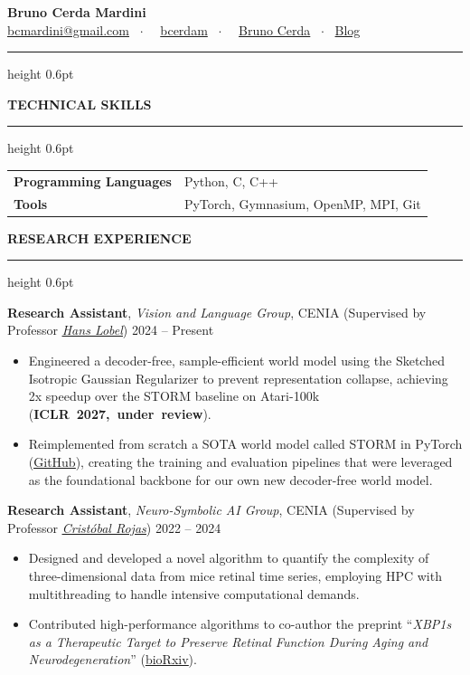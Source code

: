 \documentclass[10pt,a4paper]{article}
\newcommand{\cvsection}[1]{%
    \vspace{10pt}%
    {\large\textbf{\MakeUppercase{#1}}}%
    \vspace{3pt}%
    \hrule height 0.6pt%
    \vspace{6pt}%
}
\begin{document}
{\LARGE\textbf{Bruno Cerda Mardini}}\\[4pt]
\href{mailto:bcmardini@gmail.com}{bcmardini@gmail.com} \ $\cdot$ \ \faGithub\ \href{https://github.com/bcerdam}{bcerdam} \ $\cdot$ \ \faLinkedin\ \href{https://www.linkedin.com/in/bruno-cerda-mardini-04658520b/}{Bruno Cerda} \ $\cdot$ \ \href{https://bcerdam.github.io/website/}{Blog}

\vspace{6pt}
\hrule height 0.6pt
\vspace{2pt}

\cvsection{Technical Skills}
\begin{tabular}{@{}p{5.2cm}l@{}}
\textbf{Programming Languages} & Python, C, C++ \\
\textbf{Tools} & PyTorch, Gymnasium, OpenMP, MPI, Git \\
\end{tabular}

\cvsection{Research Experience}

\textbf{Research Assistant}, \textit{Vision and Language Group}, CENIA (Supervised by Professor \href{https://scholar.google.com/citations?user=oKYALakAAAAJ&hl=en}{\textit{\underline{Hans Lobel}}}) \hfill 2024 -- Present
\begin{itemize}
    \item Engineered a decoder-free, sample-efficient world model using the Sketched Isotropic Gaussian Regularizer to prevent representation collapse, achieving 2x speedup over the STORM baseline on Atari-100k \mbox{(\textbf{ICLR 2027, under review})}.
    \item Reimplemented from scratch a SOTA world model called STORM in PyTorch (\href{https://github.com/bcerdam/STORM-Replication}{\underline{GitHub}}), creating the training and evaluation pipelines that were leveraged as the foundational backbone for our own new decoder-free world model.
\end{itemize}

\vspace{6pt}
\textbf{Research Assistant}, \textit{Neuro-Symbolic AI Group}, CENIA (Supervised by Professor \href{https://scholar.google.com/citations?user=Z1aTUGsAAAAJ&hl=es}{\textit{\underline{Cristóbal Rojas}}}) \hfill 2022 -- 2024
\begin{itemize}
    \item Designed and developed a novel algorithm to quantify the complexity of three-dimensional data from mice retinal time series, employing HPC with multithreading to handle intensive computational demands.
    \item Contributed high-performance algorithms to co-author the preprint ``\textit{XBP1s as a Therapeutic Target to Preserve Retinal Function During Aging and Neurodegeneration}'' (\href{https://doi.org/10.1101/2025.07.03.662890}{\underline{bioRxiv}}).
\end{itemize}
\end{document}
